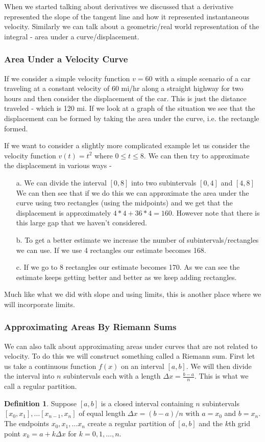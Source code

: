 \documentclass[12pt,reqno]{article}
\theoremstyle{definition}
\newtheorem*{Definition}{Definition}
\begin{document}
When we started talking about derivatives we discussed that a derivative represented the slope of the tangent line and how it represented instantaneous velocity. Similarly we can talk about a geometric/real world representation of the integral - area under a curve/displacement. 

\subsubsection{Area Under a Velocity Curve} 
If we consider a simple velocity function $v = 60$ with a simple scenario of a car traveling at a constant velocity of 60 mi/hr along a straight highway for two hours and then consider the displacement of the car. This is just the distance traveled - which is 120 mi. If we look at a graph of the situation we see that the displacement can be formed by taking the area under the curve, i.e. the rectangle formed. 

If we want to consider a slightly more complicated example let us consider the velocity function $v(t) = t^2$ where $0 \leq t \leq 8$. We can then try to approximate the displacement in various ways - 
\begin{enumerate}
	\item[a.]We can divide the interval $[0, 8]$ into two subintervals $[0, 4]$ and $[4, 8]$ We can then see that if we do this we can approximate the area under the curve using two rectangles (using the midpoints) and we get that the displacement is approximately $4*4 + 36*4 = 160$. However note that there is this large gap that we haven't considered. 
	\item[b.] To get a better estimate we increase the number of subintervals/rectangles we can use. If we use 4 rectangles our estimate becomes 168. 
	\item[c.] If we go to 8 rectangles our estimate becomes 170. As we can see the estimate keeps getting better and better as we keep adding rectangles. 
\end{enumerate}

Much like what we did with slope and using limits, this is another place where we will incorporate limits. 

\subsubsection{Approximating Areas By Riemann Sums} 

We can also talk about approximating areas under curves that are not related to velocity. To do this we will construct something called a Riemann sum. First let us take a continuous function $f(x)$ on an interval $[a, b]$. We will then divide the interval into $n$ subintervals each with a length $\Delta x = \frac{b - a}{n}$. This is what we call a regular partition. 
\begin{Definition}
	Suppose $[a, b]$ is a closed interval containing $n$ subintervals $[x_0, x_1], \ldots [x_{n - 1}, x_n]$ of equal length $\Delta x = (b - a)/n$ with $a = x_0$ and $b = x_n$. The endpoints $x_0, x_1, \ldots x_n$ create a regular partition of $[a, b]$ and the $k$th grid point $x_k = a + k\Delta x$ for $k = 0, 1, \ldots, n$. 
\end{Definition}
\end{document}
